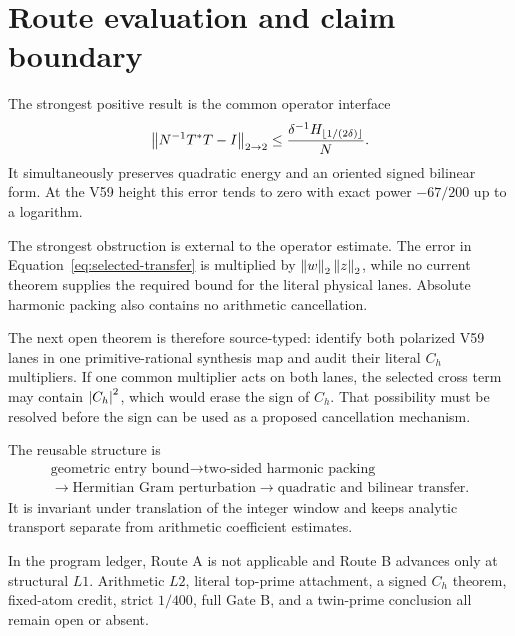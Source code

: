 \section{Route evaluation and claim boundary}\label{sec:boundary}

The strongest positive result is the common operator interface
\[
\left\lVert N^{-1}T^*T-I\right\rVert_{2\to2}
\leq\frac{\delta^{-1}H_{\lfloor1/(2\delta)\rfloor}}{N}.
\]
It simultaneously preserves quadratic energy and an oriented signed bilinear
form.  At the V59 height this error tends to zero with exact power
$-67/200$ up to a logarithm.

The strongest obstruction is external to the operator estimate.  The error in
Equation~\eqref{eq:selected-transfer} is multiplied by
$\left\lVert w\right\rVert_2\left\lVert z\right\rVert_2$, while no current theorem supplies the required bound
for the literal physical lanes.  Absolute harmonic packing also contains no
arithmetic cancellation.

The next open theorem is therefore source-typed: identify both polarized V59
lanes in one primitive-rational synthesis map and audit their literal
$C_h$ multipliers.  If one common multiplier acts on both lanes, the selected
cross term may contain $\left\lvert C_h\right\rvert^2$, which would erase the sign of $C_h$.
That possibility must be resolved before the sign can be used as a proposed
cancellation mechanism.

The reusable structure is
\[
\begin{gathered}
\text{geometric entry bound}
\longrightarrow\text{two-sided harmonic packing}\\
\longrightarrow\text{Hermitian Gram perturbation}
\longrightarrow\text{quadratic and bilinear transfer}.
\end{gathered}
\]
It is invariant under translation of the integer window and keeps analytic
transport separate from arithmetic coefficient estimates.

In the program ledger, Route A is not applicable and Route B advances only at
structural $L1$.  Arithmetic $L2$, literal top-prime attachment, a signed
$C_h$ theorem, fixed-atom credit, strict $1/400$, full Gate B, and a
twin-prime conclusion all remain open or absent.
